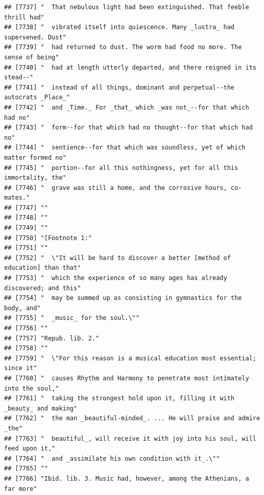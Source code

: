 \documentclass{article}\usepackage[]{graphicx}\usepackage[]{color}
\makeatletter
\newenvironment{kframe}{%
 \def\at@end@of@kframe{}%
 \ifinner\ifhmode%
  \def\at@end@of@kframe{\end{minipage}}%
  \begin{minipage}{\columnwidth}%
 \fi\fi%
 \def\FrameCommand##1{\hskip\@totalleftmargin \hskip-\fboxsep
 \colorbox{shadecolor}{##1}\hskip-\fboxsep
     \hskip-\linewidth \hskip-\@totalleftmargin \hskip\columnwidth}%
 \MakeFramed {\advance\hsize-\width
   \@totalleftmargin\z@ \linewidth\hsize
   \@setminipage}}%
 {\par\unskip\endMakeFramed%
 \at@end@of@kframe}
\newenvironment{knitrout}{}{} %
\makeatother
\begin{document}
\begin{knitrout}
\begin{kframe}
\begin{verbatim}
## [7737] "  That nebulous light had been extinguished. That feeble thrill had"         
## [7738] "  vibrated itself into quiescence. Many _lustra_ had supervened. Dust"       
## [7739] "  had returned to dust. The worm had food no more. The sense of being"       
## [7740] "  had at length utterly departed, and there reigned in its stead--"          
## [7741] "  instead of all things, dominant and perpetual--the autocrats _Place_"      
## [7742] "  and _Time._ For _that_ which _was not_--for that which had no"             
## [7743] "  form--for that which had no thought--for that which had no"                
## [7744] "  sentience--for that which was soundless, yet of which matter formed no"    
## [7745] "  portion--for all this nothingness, yet for all this immortality, the"      
## [7746] "  grave was still a home, and the corrosive hours, co-mates."                
## [7747] ""                                                                            
## [7748] ""                                                                            
## [7749] ""                                                                            
## [7750] "[Footnote 1:"                                                                
## [7751] ""                                                                            
## [7752] "  \"It will be hard to discover a better [method of education] than that"    
## [7753] "  which the experience of so many ages has already discovered; and this"     
## [7754] "  may be summed up as consisting in gymnastics for the body, and"            
## [7755] "  _music_ for the soul.\""                                                   
## [7756] ""                                                                            
## [7757] "Repub. lib. 2."                                                              
## [7758] ""                                                                            
## [7759] "  \"For this reason is a musical education most essential; since it"         
## [7760] "  causes Rhythm and Harmony to penetrate most intimately into the soul,"     
## [7761] "  taking the strongest hold upon it, filling it with _beauty_ and making"    
## [7762] "  the man _beautiful-minded_. ... He will praise and admire _the"            
## [7763] "  beautiful_, will receive it with joy into his soul, will feed upon it,"    
## [7764] "  and _assimilate his own condition with it_.\""                             
## [7765] ""                                                                            
## [7766] "Ibid. lib. 3. Music had, however, among the Athenians, a far more"           

\end{verbatim}
\end{kframe}
\end{knitrout}
\end{document}
